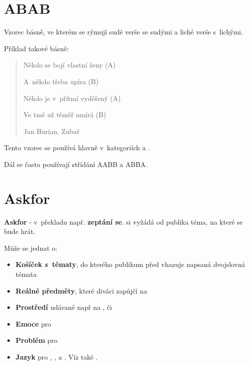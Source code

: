 \needspace{5cm} \section{ABAB} \label{abab} Vzorec básně, ve kterém se rýmují sudé verše se sudými a liché verše s~lichými. 
 
Příklad takové básně: 
	 
\begin{quote} 
Někdo se bojí vlastní ženy (A)

 
A~někdo třeba upíra (B)

 
Někdo je v~přítmí vyděšený (A)

 
Ve tmě už téměř umírá (B) 
 
Jan Burian, Zubař 
\end{quote} 
 
Tento vzorec se používá hlavně v~kategoriích  a . 
 
Dál se často používají střídání AABB a ABBA. 
 
 
 
\needspace{5cm} \section{Askfor} \label{askfor} \textbf{Askfor} - v~překladu např. \textbf{zeptání se}.  si vyžádá od publika téma, na které se bude hrát. 
 
Může se jednat o: 
\begin{itemize}
\item \textbf{Košíček s~tématy}, do kterého publikum před  vhazuje napsaná dvojslovná témata
\item \textbf{Reálné předměty}, které diváci zapůjčí na 
\item \textbf{Prostředí} udávané např na ,  či 
\item \textbf{Emoce} pro 
\item \textbf{Problém} pro 
\item \textbf{Jazyk} pro , ,  a . Víz také .
\end{itemize}
 
